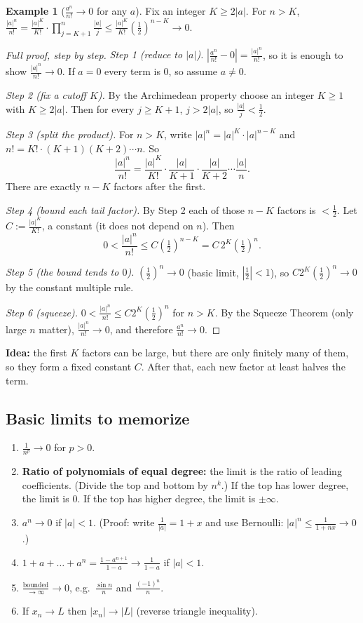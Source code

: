 \documentclass[11pt]{article}
\theoremstyle{definition}
\newtheorem{ex}[defn]{Example}
\newcommand{\key}[1]{\textcolor{red!70!black}{\textbf{#1}}}
\begin{document}
\begin{ex}[$\frac{a^n}{n!}\to0$ for any $a$]
Fix an integer $K\ge2|a|$. For $n>K$,
$\frac{|a|^n}{n!}=\frac{|a|^K}{K!}\cdot\prod_{j=K+1}^n\frac{|a|}{j}\le\frac{|a|^K}{K!}\left(\tfrac12\right)^{n-K}\to0$.

\begin{proof}[Full proof, step by step]
\emph{Step 1 (reduce to $|a|$).} $\left|\frac{a^n}{n!}-0\right|=\frac{|a|^n}{n!}$,
so it is enough to show $\frac{|a|^n}{n!}\to0$. If $a=0$ every term is $0$,
so assume $a\ne0$.

\emph{Step 2 (fix a cutoff $K$).} By the Archimedean property choose an
integer $K\ge1$ with $K\ge2|a|$. Then for every $j\ge K+1$,
$j>2|a|$, so $\frac{|a|}{j}<\frac12$.

\emph{Step 3 (split the product).} For $n>K$, write
$|a|^n=|a|^K\cdot|a|^{n-K}$ and $n!=K!\cdot(K+1)(K+2)\cdots n$. So
\[
\frac{|a|^n}{n!}=\frac{|a|^K}{K!}\cdot\frac{|a|}{K+1}\cdot\frac{|a|}{K+2}\cdots\frac{|a|}{n}.
\]
There are exactly $n-K$ factors after the first.

\emph{Step 4 (bound each tail factor).} By Step 2 each of those $n-K$
factors is $<\frac12$. Let $C:=\frac{|a|^K}{K!}$, a constant (it does not
depend on $n$). Then
\[
0<\frac{|a|^n}{n!}\le C\left(\tfrac12\right)^{n-K}=C\,2^K\left(\tfrac12\right)^n.
\]

\emph{Step 5 (the bound tends to $0$).} $\left(\frac12\right)^n\to0$ (basic
limit, $|\frac12|<1$), so $C2^K\left(\frac12\right)^n\to0$ by the constant
multiple rule.

\emph{Step 6 (squeeze).} $0<\frac{|a|^n}{n!}\le C2^K(\frac12)^n$ for $n>K$.
By the Squeeze Theorem (only large $n$ matter), $\frac{|a|^n}{n!}\to0$,
and therefore $\frac{a^n}{n!}\to0$.
\end{proof}
\noindent\key{Idea:} the first $K$ factors can be large, but there are
only finitely many of them, so they form a fixed constant $C$. After that,
each new factor at least halves the term.
\end{ex}

\subsection{Basic limits to memorize}
\begin{enumerate}[nosep]
  \item $\frac1{n^p}\to0$ for $p>0$.
  \item \textbf{Ratio of polynomials of equal degree:} the limit is the
        ratio of leading coefficients. (Divide the top and bottom by $n^k$.)
        If the top has lower degree, the limit is $0$. If the top has higher
        degree, the limit is $\pm\infty$.
  \item $a^n\to0$ if $|a|<1$. (Proof: write $\frac1{|a|}=1+x$ and use
        Bernoulli: $|a|^n\le\frac{1}{1+nx}\to0$.)
  \item $1+a+\dots+a^n=\frac{1-a^{n+1}}{1-a}\to\frac1{1-a}$ if $|a|<1$.
  \item $\frac{\text{bounded}}{\to\infty}\to0$, e.g.\ $\frac{\sin n}{n}$ and
        $\frac{(-1)^n}{n}$.
  \item If $x_n\to L$ then $|x_n|\to|L|$ (reverse triangle inequality).
\end{enumerate}
\end{document}
